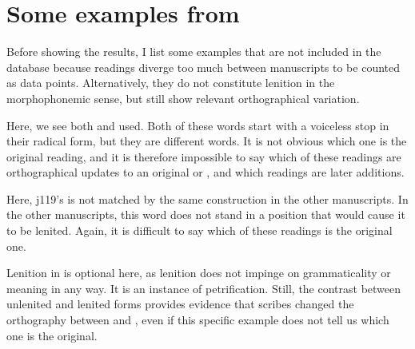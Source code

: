 \section{Some examples from }
\label{sec:some-examples-from}
Before showing the results, I list some examples that are not included in the database because readings diverge too much between manuscripts to be counted as data points. Alternatively, they do not constitute lenition in the morphophonemic sense, but still show relevant orthographical variation. 
\begin{mwl}
\end{mwl}
Here, we see both  and  used. Both of these words start with a voiceless stop in their radical form, but they are different words. It is not obvious which one is the original reading, and it is therefore impossible to say which of these readings are orthographical updates to an original  or , and which readings are later additions.

\begin{mwl}
\end{mwl}
Here, \gls{j119}'s  is not matched by the same construction in the other manuscripts. In the other manuscripts, this word does not stand in a position that would cause it to be lenited. Again, it is difficult to say which of these readings is the original one.

\begin{mwl}
\end{mwl}
Lenition in  is optional here, as lenition does not impinge on grammaticality or meaning in any way. It is an instance of petrification. Still, the contrast between unlenited and lenited forms provides evidence that scribes changed the orthography between  and , even if this specific example does not tell us which one is the original.

